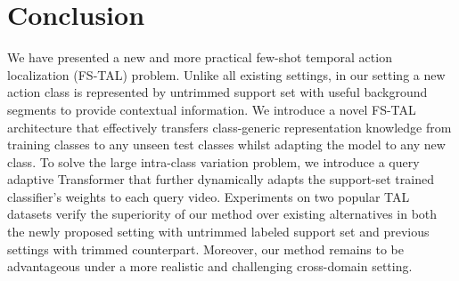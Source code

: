 \documentclass{bmvc2k}
\begin{document}
\section{Conclusion}
We have presented a new and more practical few-shot temporal action localization (FS-TAL) problem.
Unlike all existing settings, 
in our setting a new action class is represented by untrimmed support set with useful background segments to provide contextual information.
We introduce a novel FS-TAL architecture
that effectively transfers class-generic representation
knowledge from training classes to any unseen test classes whilst adapting the model to any new class.
To solve the large intra-class variation problem,
we introduce a query adaptive Transformer
that further dynamically adapts the support-set trained classifier's weights to each query video.
Experiments on two popular TAL datasets
verify the superiority of our method over existing alternatives
in both the newly proposed setting with untrimmed labeled support set and previous settings with trimmed counterpart.
Moreover, our method remains to be advantageous
under a more realistic and challenging cross-domain setting.





\end{document}
